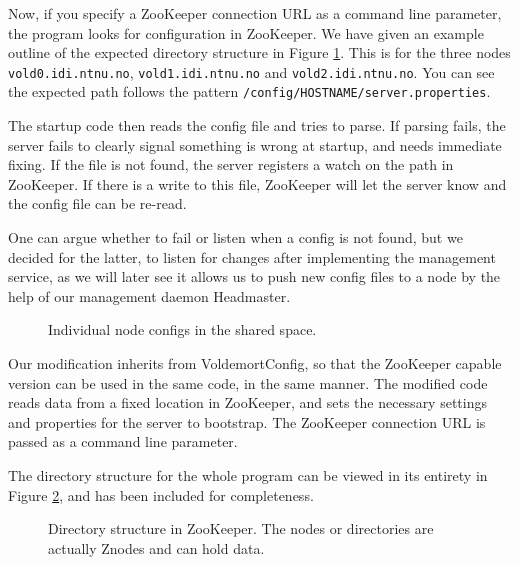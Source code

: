 Now, if you specify a ZooKeeper connection URL as a command line parameter, the program looks for configuration in ZooKeeper.
We have given an example outline of the expected directory structure in Figure \ref{fig:configdirs}. This is for the three nodes \texttt{vold0.idi.ntnu.no}, \texttt{vold1.idi.ntnu.no} and \texttt{vold2.idi.ntnu.no}. You can see the expected path follows the pattern \texttt{/config/HOSTNAME/server.properties}. 

The startup code then reads the config file and tries to parse. If parsing fails, the server fails to clearly signal something is wrong at startup, and needs immediate fixing. If the file is not found, the server registers a watch on the path in ZooKeeper. If there is a write to this file, ZooKeeper will let the server know and the config file can be re-read. 

One can argue whether to fail or listen when a config is not found, but we decided for the latter, to listen for changes after implementing the management service, as we will later see it allows us to push new config files to a node by the help of our management daemon Headmaster. 

\begin{figure}[h]
\label{fig:configdirs}
\caption{Individual node configs in the shared space.}
\end{figure}

Our modification inherits from VoldemortConfig, so that the ZooKeeper capable version can be used in the same code, in the same manner. The modified code reads data from a fixed location in ZooKeeper, and sets the necessary settings and properties for the server to bootstrap. The ZooKeeper connection URL is passed as a command line parameter.

The directory structure for the whole program can be viewed in its entirety in Figure \ref{fig:dirstruct}, and has been included for completeness.

\begin{figure}[h]
\label{fig:dirstruct}
\caption{Directory structure in ZooKeeper. The nodes or directories are actually Znodes and can hold data.}
\end{figure}

